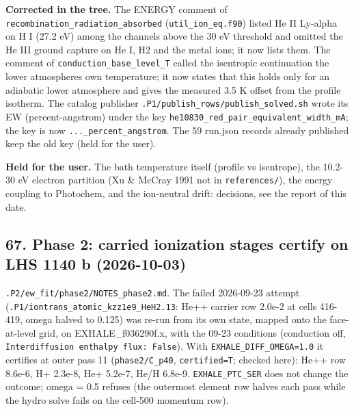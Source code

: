 \documentclass[english,a4paper]{my_memo}
\begin{document}
\textbf{Corrected in the tree.} The ENERGY comment of
\texttt{recombination\_radiation\_absorbed} (\texttt{util\_ion\_eq.f90}) listed He II
Ly-alpha on H I (27.2 eV) among the channels above the 30 eV threshold and
omitted the He III ground capture on He I, H2 and the metal ions; it now
lists them. The comment of \texttt{conduction\_base\_level\_T} called the isentropic
continuation the lower atmosphere\textquotesingle s own temperature; it now states that
this holds only for an adiabatic lower atmosphere and gives the measured
3.5 K offset from the profile isotherm. The catalog publisher
\texttt{.P1/publish\_rows/publish\_solved.sh} wrote its EW (percent-angstrom) under
the key \texttt{he10830\_red\_pair\_equivalent\_width\_mA}; the key is now
\texttt{...\_percent\_angstrom}. The 59 run.json records already published keep the
old key (held for the user).

\textbf{Held for the user.} The bath temperature itself (profile vs isentrope),
the 10.2-30 eV electron partition (Xu \& McCray 1991 not in \texttt{references/}),
the energy coupling to Photochem, and the ion-neutral drift: decisions, see
the report of this date.

\subsection{67. Phase 2: carried ionization stages certify on LHS 1140 b (2026-10-03)}\label{67-phase-2-carried-ionization-stages-certify-on-lhs-1140-b-2026-10-03}

\texttt{.P2/ew\_fit/phase2/NOTES\_phase2.md}. The failed 2026-09-23 attempt
(\texttt{.P1/iontrans\_atomic\_kzz1e9\_HeH2.13}: He++ carrier row 2.0e-2 at cells
416-419, omega halved to 0.125) was re-run from its own state, mapped onto
the face-at-level grid, on EXHALE\_f036290f.x, with the 09-23 conditions
(conduction off, \texttt{Interdiffusion\ enthalpy\ flux:\ False}). With
\texttt{EXHALE\_DIFF\_OMEGA=1.0} it certifies at outer pass 11
(\texttt{phase2/C\_p40}, \texttt{certified=T}; checked here): He++ row 8.6e-6, H+ 2.3e-8,
He+ 5.2e-7, He/H 6.8e-9. \texttt{EXHALE\_PTC\_SER} does not change the outcome;
omega = 0.5 refuses (the outermost element row halves each pass while the
hydro solve fails on the cell-500 momentum row).
\end{document}
